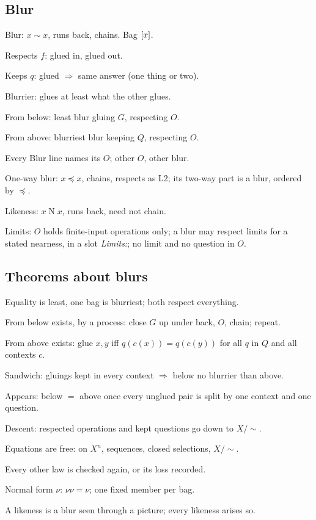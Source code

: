 \subsection*{Blur}
\begin{lines}
\item[\lab{L1}] Blur: $x \sim x$, runs back, chains. Bag $[x]$.
\item[\lab{L2}] Respects $f$: glued in, glued out.
\item[\lab{L3}] Keeps $q$: glued $\Rightarrow$ same answer (one thing or two).
\item[\lab{L4}] Blurrier: glues at least what the other glues.
\item[\lab{L5}] From below: least blur gluing $G$, respecting $O$.
\item[\lab{L6}] From above: blurriest blur keeping $Q$, respecting $O$.
\item[\lab{L7}] Every Blur line names its $O$; other $O$, other blur.
\item[\lab{L8}] One-way blur: $x \preceq x$, chains, respects as L2; its two-way part is a blur, ordered by $\preceq$.
\item[\lab{L9}] Likeness: $x \mathrel{N} x$, runs back, need not chain.
\item[\lab{L10}] Limits: $O$ holds finite-input operations only; a blur may respect limits for a stated nearness, in a slot \emph{Limits:}; no limit and no question in $O$.
\end{lines}

\subsection*{Theorems about blurs}
\begin{lines}
\item[\lab{Z1}] Equality is least, one bag is blurriest; both respect everything.
\item[\lab{Z2}] From below exists, by a process: close $G$ up under back, $O$, chain; repeat.
\item[\lab{Z3}] From above exists: glue $x, y$ iff $q(c(x)) = q(c(y))$ for all $q$ in $Q$ and all contexts $c$.
\item[\lab{Z4}] Sandwich: gluings kept in every context $\Rightarrow$ below no blurrier than above.
\item[\lab{Z5}] Appears: below $=$ above once every unglued pair is split by one context and one question.
\item[\lab{Z6}] Descent: respected operations and kept questions go down to $X/{\sim}$.
\item[\lab{Z7}] Equations are free: on $X^n$, sequences, closed selections, $X/{\sim}$.
\item[\lab{Z8}] Every other law is checked again, or its loss recorded.
\item[\lab{Z9}] Normal form $\nu$: $\nu\nu = \nu$; one fixed member per bag.
\item[\lab{Z10}] A likeness is a blur seen through a picture; every likeness arises so.
\end{lines}

